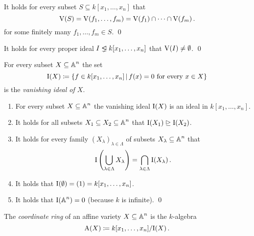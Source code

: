 \begin{corollary}
  It holds for every subset $S \subseteq k[x_1, \dotsc, x_n]$ that
  \[
      \operatorname{V}(S)
    = \operatorname{V}(f_1, \dotsc, f_m)
    = \operatorname{V}(f_1) \cap \dotsb \cap \operatorname{V}(f_m) \,.
  \]
  for some finitely many $f_1, \dotsc, f_m \in S$.
  \qed
\end{corollary}


\begin{theorem}
  It holds for every proper ideal $I \ideallneq k[x_1, \dotsc, x_n]$ that $\operatorname{V}(I) \neq \emptyset$.
  \qed
\end{theorem}


\begin{definition}
  For every subset $X \subseteq \operatorname{\mathbb{A}}^n$ the set
  \[
              \Ideal(X)
    \defined  \{
                f \in k[x_1, \dotsc, x_n]
              \suchthat
                \text{$f(x) = 0$ for every $x \in X$}
              \}
  \]
  is the \emph{vanishing ideal of $X$}.
\end{definition}


\begin{lemma}
  \leavevmode
  \begin{enumerate}
    \item
      For every subset $X \subseteq \operatorname{\mathbb{A}}^n$ the vanishing ideal $\operatorname{I}(X)$ is an ideal in $k[x_1, \dotsc, x_n]$.
    \item
      It holds for all subsets $X_1 \subseteq X_2 \subseteq \operatorname{\mathbb{A}}^n$ that $\operatorname{I}(X_1) \trianglerighteq \operatorname{I}(X_2)$.
    \item
      It holds for every family $(X_\lambda)_{\lambda \in \Lambda}$ of subsets $X_\lambda \subseteq \operatorname{\mathbb{A}}^n$ that
      \[
          \operatorname{I}\left( \bigcup_{\lambda \in \Lambda} X_\lambda \right)
        = \bigcap_{\lambda \in \Lambda} \operatorname{I}(X_\lambda) \,.
      \]
    \item
      It holds that $\operatorname{I}(\emptyset) = (1) = k[x_1, \dotsc, x_n]$.
    \item
      It holds that $\operatorname{I}(\operatorname{\mathbb{A}}^n) = 0$ (because $k$ is infinite).
    \qed
  \end{enumerate}
\end{lemma}


\begin{definition}
  The \emph{coordinate ring} of an affine variety $X \subseteq \operatorname{\mathbb{A}}^n$ is the $k$-algebra
  \[
              \operatorname{A}(X)
    \coloneqq  k[x_1, \dotsc, x_n]/{\operatorname{I}(X)} \,.
  \]
\end{definition}


